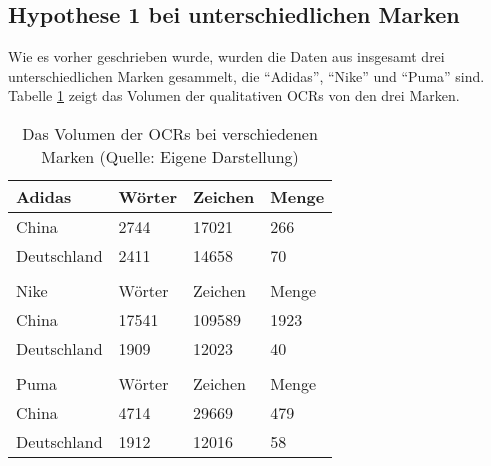 \subsection{Hypothese 1 bei unterschiedlichen Marken}
Wie es vorher geschrieben wurde, wurden die Daten aus insgesamt drei unterschiedlichen Marken gesammelt, die ``Adidas'', ``Nike'' und ``Puma'' sind. Tabelle \ref{tab:volumenMarken} zeigt das Volumen der qualitativen \ac{OCRs} von den drei Marken.
\begin{table}[htb]
\centering
\begin{tabular}{|llll|}
\hline
\multicolumn{1}{|l|}{Adidas}      & \multicolumn{1}{l|}{Wörter} & \multicolumn{1}{l|}{Zeichen} & Menge \\ \hline
\multicolumn{1}{|l|}{China}       & \multicolumn{1}{l|}{2744}   & \multicolumn{1}{l|}{17021}   & 266    \\ \hline
\multicolumn{1}{|l|}{Deutschland} & \multicolumn{1}{l|}{2411}   & \multicolumn{1}{l|}{14658}   & 70     \\ \hline
                                  &                             &                              &        \\ \hline
\multicolumn{1}{|l|}{Nike}        & \multicolumn{1}{l|}{Wörter} & \multicolumn{1}{l|}{Zeichen} & Menge \\ \hline
\multicolumn{1}{|l|}{China}       & \multicolumn{1}{l|}{17541}  & \multicolumn{1}{l|}{109589}  & 1923   \\ \hline
\multicolumn{1}{|l|}{Deutschland} & \multicolumn{1}{l|}{1909}   & \multicolumn{1}{l|}{12023}   & 40     \\ \hline
                                  &                             &                              &        \\ \hline
\multicolumn{1}{|l|}{Puma}        & \multicolumn{1}{l|}{Wörter} & \multicolumn{1}{l|}{Zeichen} & Menge \\ \hline
\multicolumn{1}{|l|}{China}       & \multicolumn{1}{l|}{4714}   & \multicolumn{1}{l|}{29669}   & 479    \\ \hline
\multicolumn{1}{|l|}{Deutschland} & \multicolumn{1}{l|}{1912}   & \multicolumn{1}{l|}{12016}   & 58     \\ \hline
\end{tabular}
\caption[Das Volumen der OCRs bei verschiedenen Marken]{Das Volumen der \ac{OCRs} bei verschiedenen Marken (Quelle: Eigene Darstellung)}
\label{tab:volumenMarken}
\end{table}

